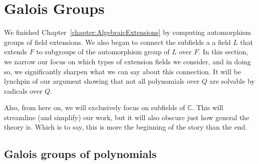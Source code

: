 \chapter{Galois Groups}
\label{chapter:GaloisGroups}
\thispagestyle{empty}

We finished Chapter~\ref{chapter:AlgebraicExtensions} by computing automorphism groups of field extensions. We also began to connect the subfields a a field $L$ that extends $F$ to subgroups of the automorphism group of $L$ over $F$. In this section, we narrow our focus on which types of extension fields we consider, and in doing so, we significantly sharpen what we can say about this connection. It will be lynchpin of our argument showing that not all polynomials over $Q$ are solvable by radicals over $Q$.

Also, from here on, we will exclusively focus on subfields of $\mathbb{C}$. This will streamline (and simplify) our work, but it will also obscure just how general the theory is. Which is to say, this is more the beginning of the story than the end. 

\section{Galois groups of polynomials}

